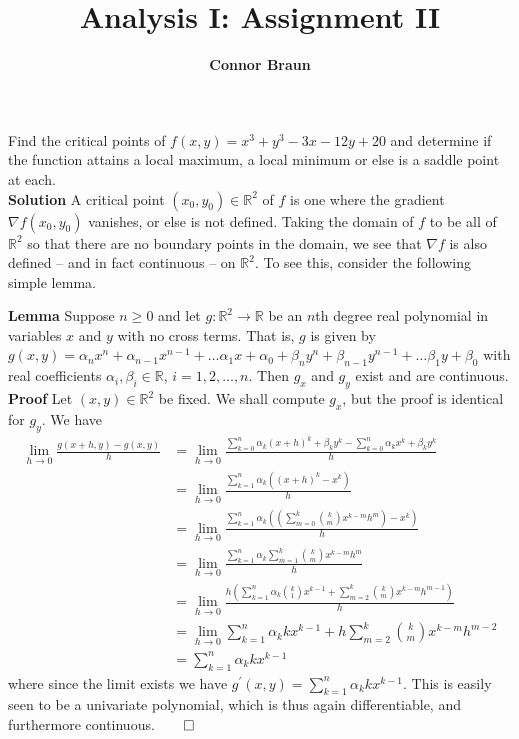 \documentclass[11pt, letterpaper]{article}
\title{\bf Analysis I: Assignment II}
\author{\bf Connor Braun}
\date{}
\newcommand{\mbb}[1]{\mathbb{#1}}
\begin{document}
    \maketitle
     Find the critical points of $f(x,y)=x^3+y^3-3x-12y+20$ and determine if the function attains
    a local maximum, a local minimum or else is a saddle point at each.\\[10pt]
    {\bf Solution} A critical point $(x_0,y_0)\in\mbb{R}^2$ of $f$ is one where the gradient $\nabla f(x_0,y_0)$ vanishes, or else is
    not defined. Taking the domain of $f$ to be all of $\mbb{R}^2$ so that there are no boundary points in the domain, we see that $\nabla f$
    is also defined -- and in fact continuous -- on $\mbb{R}^2$. To see this, consider the following simple lemma.
    \begin{center}
        \begin{minipage}[c]{0.85\linewidth}
            {\bf Lemma} Suppose $n\geq 0$ and let $g:\mbb{R}^2\rightarrow\mbb{R}$ be an $n$th degree real polynomial in variables $x$ and $y$ with no cross terms. That is, $g$ is given by
            $g(x,y)=\alpha_nx^n+\alpha_{n-1}x^{n-1}+\dots\alpha_1x+\alpha_0+\beta_ny^n+\beta_{n-1}y^{n-1}+\dots\beta_1y+\beta_0$ with real coefficients $\alpha_i,\beta_i\in\mbb{R}$, $i=1,2,\dots,n$.
            Then $g_x$ and $g_y$ exist and are continuous.\\[10pt]
            {\bf Proof} Let $(x,y)\in\mbb{R}^2$ be fixed. We shall compute $g_x$, but the proof is identical for $g_y$. We have
            \begin{align*}
                \lim_{h\rightarrow0}\frac{g(x+h,y)-g(x,y)}{h}&=\lim_{h\rightarrow0}\frac{\sum_{k=0}^n\alpha_k(x+h)^k+\beta_ky^k-\sum_{k=0}^n\alpha_kx^k+\beta_ky^k}{h}\\
                &=\lim_{h\rightarrow0}\frac{\sum_{k=1}^n\alpha_k((x+h)^k-x^k)}{h}\\
                &=\lim_{h\rightarrow0}\frac{\sum_{k=1}^n\alpha_k\left(\left(\sum_{m=0}^k {k\choose m}x^{k-m}h^m\right)-x^k\right)}{h}\\
                &=\lim_{h\rightarrow0}\frac{\sum_{k=1}^n\alpha_k\sum_{m=1}^k {k\choose m}x^{k-m}h^m}{h}\\
                &=\lim_{h\rightarrow0}\frac{h\left(\sum_{k=1}^n\alpha_k{k\choose 1}x^{k-1}+\sum_{m=2}^k{k\choose m}x^{k-m}h^{m-1}\right)}{h}\\
                &=\lim_{h\rightarrow0}\sum_{k=1}^n\alpha_kkx^{k-1}+h\sum_{m=2}^k{k\choose m}x^{k-m}h^{m-2}\\
                &=\sum_{k=1}^n\alpha_kkx^{k-1}
            \end{align*}
            where since the limit exists we have $g^\prime(x,y)=\sum_{k=1}^n\alpha_kkx^{k-1}$. This is easily seen to be a univariate polynomial, which is thus again differentiable, and furthermore continuous.\hfill{$\qed$}
        \end{minipage}
    \end{center}\vspace{10pt}
\end{document}
